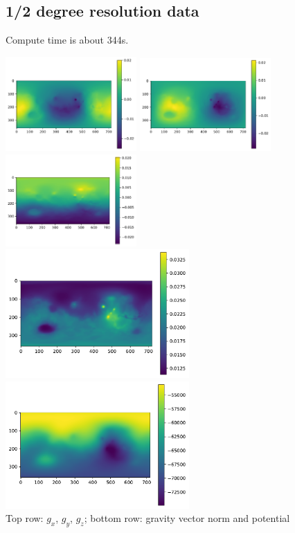 \subsection*{1/2 degree resolution data}

Compute time is about 344s. 

\begin{center}
\includegraphics[width=5cm]{python_codes/fieldstone_100/results/half/gx}
\includegraphics[width=5cm]{python_codes/fieldstone_100/results/half/gy}
\includegraphics[width=5cm]{python_codes/fieldstone_100/results/half/gz}\\
\includegraphics[width=7cm]{python_codes/fieldstone_100/results/half/gg}
\includegraphics[width=7cm]{python_codes/fieldstone_100/results/half/UU}\\
{\captionfont Top row: $g_x$, $g_y$, $g_z$;
bottom row: gravity vector norm and potential}
\end{center}

